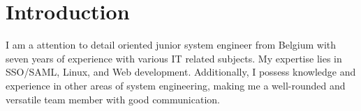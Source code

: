 \section{Introduct\textcolor{mycolor}{ion}}
\begin{center}
  I am a attention to detail oriented junior \textcolor{mycolor}{system engineer} from Belgium with seven years of experience with various \textcolor{mycolor}{IT} related subjects.
  My expertise lies in \textcolor{mycolor}{SSO/SAML, Linux, and Web development}. Additionally, 
  I possess knowledge and experience in other areas of system engineering, making me a well-rounded and versatile team member with good communication.
\end{center}

